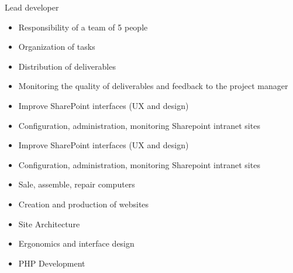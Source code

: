 \documentclass[9pt,a4paper]{altacv}
\begin{document}
\begin{large}
Lead developer
\end{large}
\begin{itemize}
\item Responsibility of a team of 5 people
\item Organization of tasks
\item Distribution of deliverables
\item Monitoring the quality of deliverables and feedback to the project manager
\end{itemize}

\divider

\begin{itemize}
\item Improve SharePoint interfaces (UX and design)
\item Configuration, administration, monitoring Sharepoint intranet sites 
\end{itemize}

\divider

\begin{itemize}
\item Improve SharePoint interfaces (UX and design)
\item Configuration, administration, monitoring Sharepoint intranet sites 
\end{itemize}

\divider

\begin{itemize}
\item Sale, assemble, repair computers
\end{itemize}

\divider

\begin{itemize}
\item Creation and production of websites
\item Site Architecture
\item Ergonomics and interface design
\item PHP Development
\end{itemize}

\clearpage
\end{document}
